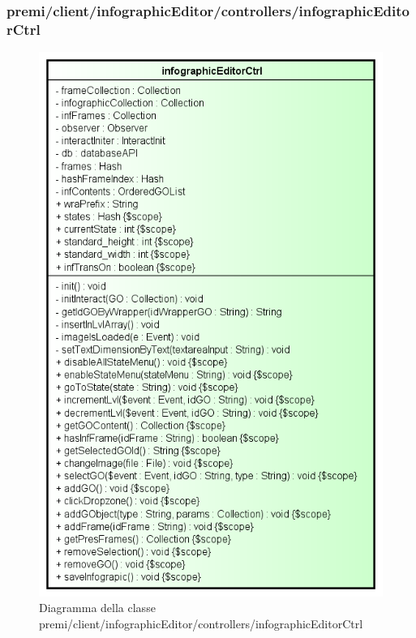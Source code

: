 \subsubsection{premi/client/infographicEditor/controllers/infographicEditorCtrl}
\begin{figure}[H]
\begin{center}
\includegraphics[scale=0.55]{img/diacla/infographicEditorCtrl.png}
\caption{Diagramma della classe premi/client/infographicEditor/controllers/infographicEditorCtrl}
\end{center}
\end{figure}



